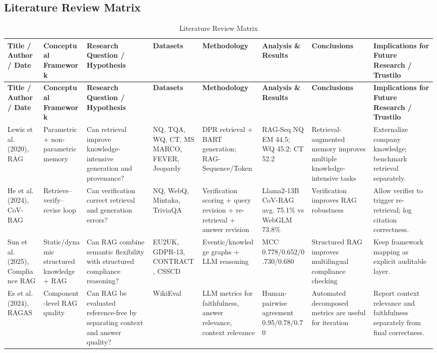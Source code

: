 \documentclass[11pt,journal,onecolumn]{IEEEtran}
\begin{document}
\subsection{Literature Review Matrix}
\begin{landscape}
\scriptsize
\setlength{\tabcolsep}{3pt}
\begin{longtable}{L{2.5cm}L{2.6cm}L{3.0cm}L{2.5cm}L{3.0cm}L{3.0cm}L{2.6cm}L{3.0cm}}
\caption{Literature Review Matrix}\label{tab:litmatrix}\\
\toprule
\textbf{Title / Author / Date} & \textbf{Conceptual Framework} & \textbf{Research Question / Hypothesis} & \textbf{Datasets} & \textbf{Methodology} & \textbf{Analysis \& Results} & \textbf{Conclusions} & \textbf{Implications for Future Research / Trustilo} \\
\midrule
\endfirsthead
\toprule
\textbf{Title / Author / Date} & \textbf{Conceptual Framework} & \textbf{Research Question / Hypothesis} & \textbf{Datasets} & \textbf{Methodology} & \textbf{Analysis \& Results} & \textbf{Conclusions} & \textbf{Implications for Future Research / Trustilo} \\
\midrule
\endhead
Lewis et al. (2020), RAG & Parametric + non-parametric memory & Can retrieval improve knowledge-intensive generation and provenance? & NQ, TQA, WQ, CT, MS MARCO, FEVER, Jeopardy & DPR retrieval + BART generation; RAG-Sequence/Token & RAG-Seq NQ EM 44.5; WQ 45.2; CT 52.2 & Retrieval-augmented memory improves multiple knowledge-intensive tasks & Externalize company knowledge; benchmark retrieval separately. \\
\midrule
He et al. (2024), CoV-RAG & Retrieve--verify--revise loop & Can verification correct retrieval and generation errors? & NQ, WebQ, Mintaka, TriviaQA & Verification scoring + query revision + re-retrieval + answer revision & Llama2-13B CoV-RAG avg. 75.1\% vs WebGLM 73.8\% & Verification improves RAG robustness & Allow verifier to trigger re-retrieval; log citation correctness. \\
\midrule
Sun et al. (2025), Compliance RAG & Static/dynamic structured knowledge + RAG & Can RAG combine semantic flexibility with structured compliance reasoning? & EU2UK, GDPR-13, CONTRACT, CSSCD & Eventic/knowledge graphs + LLM reasoning & MCC 0.778/0.652/0.730/0.680 & Structured RAG improves multilingual compliance checking & Keep framework mapping as explicit auditable layer. \\
\midrule
Es et al. (2024), RAGAS & Component-level RAG quality & Can RAG be evaluated reference-free by separating context and answer quality? & WikiEval & LLM metrics for faithfulness, answer relevance, context relevance & Human-pairwise agreement 0.95/0.78/0.70 & Automated decomposed metrics are useful for iteration & Report context relevance and faithfulness separately from final correctness. \\

\end{longtable}
\end{landscape}
\end{document}
